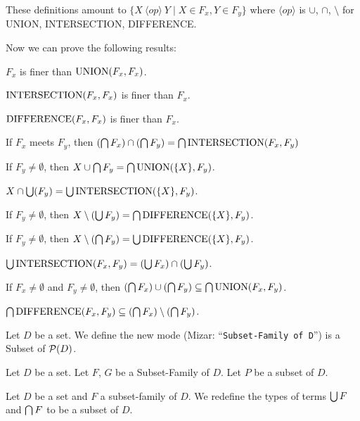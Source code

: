 \documentclass{article}
\begin{document}
\begin{remark}
These definitions amount to $\{X~\langle op\rangle~Y\mid X\in F_{x},Y\in F_{y}\}$
where $\langle op\rangle$ is $\cup$, $\cap$, $\setminus$ for UNION,
INTERSECTION, DIFFERENCE.
\end{remark}

Now we can prove the following results:
\begin{thm}
\item\label{setfam1:20} $F_{x}$ is finer than $\operatorname{UNION}(F_{x},F_{x})$.
\item\label{setfam1:21} $\operatorname{INTERSECTION}(F_{x},F_{x})$ is finer than $F_{x}$.
\item\label{setfam1:22} $\operatorname{DIFFERENCE}(F_{x},F_{x})$ is finer than $F_{x}$.
\item\label{setfam1:23} If $F_{x}$ meets $F_{y}$,
  then $(\bigcap F_{x})\cap(\bigcap F_{y}) = \bigcap\operatorname{INTERSECTION}(F_{x},F_{y})$
\item\label{setfam1:24} If $F_{y}\neq\emptyset$, then
  $X\cup\bigcap F_{y}=\bigcap\operatorname{UNION}(\{X\},F_{y})$.
\item\label{setfam1:25} $X\cap\bigcup(F_{y})=\bigcup\operatorname{INTERSECTION}(\{X\},F_{y})$.
\item\label{setfam1:26} If $F_{y}\neq\emptyset$,
  then $X\setminus(\bigcup F_{y})=\bigcap\operatorname{DIFFERENCE}(\{X\},F_{y})$.
\item\label{setfam1:27} If $F_{y}\neq\emptyset$,
  then $X\setminus(\bigcap F_{y})=\bigcup\operatorname{DIFFERENCE}(\{X\},F_{y})$.
\item\label{setfam1:28} $\bigcup\operatorname{INTERSECTION}(F_{x},F_{y})=(\bigcup F_{x})\cap(\bigcup F_{y})$.
\item\label{setfam1:29} If $F_{x}\neq\emptyset$ and
  $F_{y}\neq\emptyset$, then
  $(\bigcap F_{x})\cup(\bigcap F_{y})\subseteq\bigcap\operatorname{UNION}(F_{x},F_{y})$.
\item\label{setfam1:30}
  $\bigcap\operatorname{DIFFERENCE}(F_{x},F_{y})\subseteq(\bigcap F_{x})\setminus(\bigcap F_{y})$.
\end{thm}

\begin{definition}
Let $D$ be a set. We define the new mode 
(Mizar: ``\verb#Subset-Family of D#'')
is a Subset of $\mathcal{P}(D)$.
\end{definition}

Let $D$ be a set.
Let $F$, $G$ be a Subset-Family of $D$. Let $P$ be a subset of $D$.

\begin{definition}
Let $D$ be a set and $F$ a subset-family of $D$.
We redefine the types of terms $\bigcup F$ and $\bigcap F$ to be a subset of $D$.
\end{definition}
\end{document}
